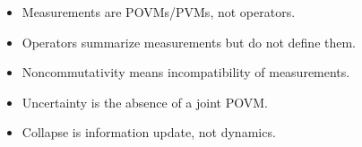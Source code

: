 \documentclass[11pt]{article}
\begin{document}
\begin{itemize}
\item Measurements are POVMs/PVMs, not operators.
\item Operators summarize measurements but do not define them.
\item Noncommutativity means incompatibility of measurements.
\item Uncertainty is the absence of a joint POVM.
\item Collapse is information update, not dynamics.
\end{itemize}

\begin{center}
\end{center}
\end{document}
